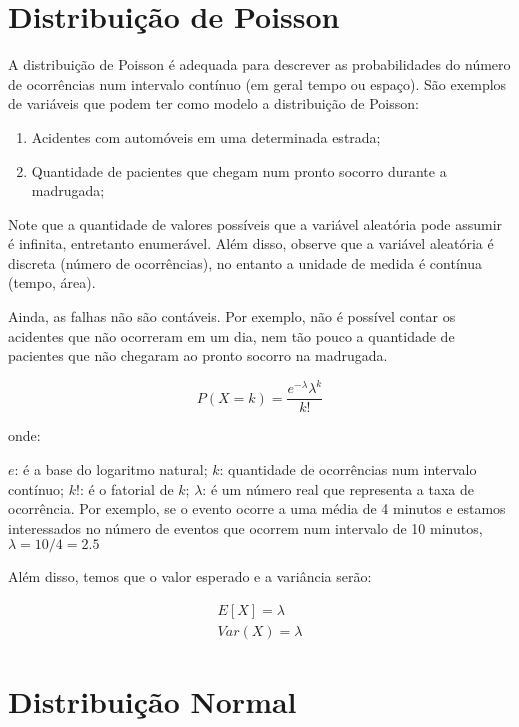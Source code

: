   \section{Distribuição de Poisson}
  
\inic A distribuição de Poisson é adequada para descrever as probabilidades do número de ocorrências num intervalo contínuo (em geral tempo ou espaço). São exemplos de variáveis que podem ter como modelo
a distribuição de Poisson:

\begin{enumerate}
    \item Acidentes com automóveis em uma determinada estrada;
    \item Quantidade de pacientes que chegam num pronto socorro durante a madrugada;
\end{enumerate}
 
\inic Note que a quantidade de valores possíveis que a variável aleatória pode assumir é infinita, entretanto enumerável. Além disso, observe que a variável aleatória é discreta (número de ocorrências), no entanto a unidade de medida é contínua (tempo, área).\vskip0.3cm

Ainda, as falhas não são contáveis. Por exemplo, não é possível contar os acidentes que não ocorreram em um dia, nem tão pouco a quantidade de pacientes que não chegaram ao pronto socorro na madrugada.
 
 
\begin{equation}
    P\left(X=k\right)= \frac{e^{-\lambda}\lambda^{k}}{k!}
\end{equation}

onde:

\inic $e$: é a base do logaritmo natural;
\inic $k$: quantidade de ocorrências num intervalo contínuo;
\inic $k!$: é o fatorial de $k$; 
\inic $\lambda$: é um número real que representa a taxa de ocorrência. Por exemplo, se o evento ocorre a uma média de 4 minutos e estamos interessados no número de eventos que ocorrem num intervalo de 10 minutos, $\lambda={10}/{4}=2.5$
  
Além disso, temos que o valor esperado e a variância serão: 

$$
\begin{aligned}
E\left[X\right] =\lambda \\
Var\left(X\right) = \lambda
\end{aligned}
$$
 
 
\section{Distribuição Normal}

